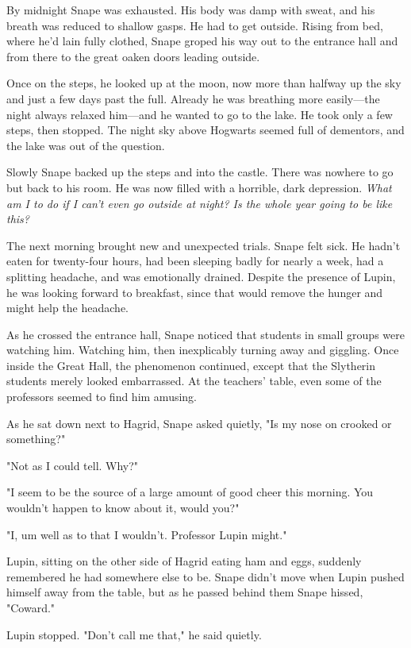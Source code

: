By midnight Snape was exhausted. His body was damp with sweat, and his breath was reduced to shallow gasps. He had to get outside. Rising from bed, where he'd lain fully clothed, Snape groped his way out to the entrance hall and from there to the great oaken doors leading outside.

Once on the steps, he looked up at the moon, now more than halfway up the sky and just a few days past the full. Already he was breathing more easily—the night always relaxed him—and he wanted to go to the lake. He took only a few steps, then stopped. The night sky above Hogwarts seemed full of dementors, and the lake was out of the question.

Slowly Snape backed up the steps and into the castle. There was nowhere to go but back to his room. He was now filled with a horrible, dark depression. \emph{What am I to do if I can't even go outside at night? Is the whole year going to be like this?}

The next morning brought new and unexpected trials. Snape felt sick. He hadn't eaten for twenty-four hours, had been sleeping badly for nearly a week, had a splitting headache, and was emotionally drained. Despite the presence of Lupin, he was looking forward to breakfast, since that would remove the hunger and might help the headache.

As he crossed the entrance hall, Snape noticed that students in small groups were watching him. Watching him, then inexplicably turning away and giggling. Once inside the Great Hall, the phenomenon continued, except that the Slytherin students merely looked embarrassed. At the teachers' table, even some of the professors seemed to find him amusing.

As he sat down next to Hagrid, Snape asked quietly, "Is my nose on crooked or something?"

"Not as I could tell. Why?"

"I seem to be the source of a large amount of good cheer this morning. You wouldn't happen to know about it, would you?"

"I, um{\el} well as to that{\el} I wouldn't. Professor Lupin might."

Lupin, sitting on the other side of Hagrid eating ham and eggs, suddenly remembered he had somewhere else to be. Snape didn't move when Lupin pushed himself away from the table, but as he passed behind them Snape hissed, "Coward."

Lupin stopped. "Don't call me that," he said quietly.

